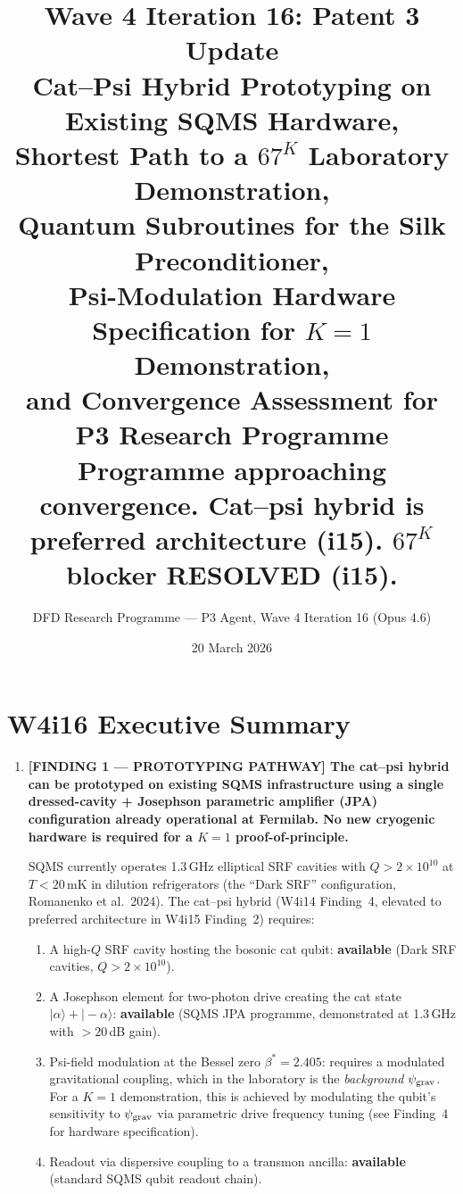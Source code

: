 \documentclass[11pt]{article}
\title{\textbf{Wave 4 Iteration 16: Patent 3 Update}\\[6pt]
Cat--Psi Hybrid Prototyping on Existing SQMS Hardware,\\
Shortest Path to a $67^K$ Laboratory Demonstration,\\
Quantum Subroutines for the Silk Preconditioner,\\
Psi-Modulation Hardware Specification for $K=1$ Demonstration,\\
and Convergence Assessment for P3 Research Programme\\[4pt]
{\normalsize Programme approaching convergence.
Cat--psi hybrid is preferred architecture (i15).
$67^K$ blocker RESOLVED (i15).}}
\author{DFD Research Programme --- P3 Agent, Wave 4 Iteration 16 (Opus 4.6)}
\date{20 March 2026}
\theoremstyle{definition}
\theoremstyle{remark}
\newcommand{\ee}[1]{\times 10^{#1}}
\newcommand{\psigrav}{\psi_{\rm grav}}
\begin{document}
\maketitle
\tableofcontents
\newpage

\section*{W4i16 Executive Summary}

\begin{tcolorbox}[colback=blue!5!white, colframe=blue!60!black,
  title=\textbf{W4i16 TOP 5 FINDINGS --- READ FIRST}]
\begin{enumerate}[nosep]

\item \textbf{[FINDING 1 --- PROTOTYPING PATHWAY] The cat--psi hybrid
  can be prototyped on existing SQMS infrastructure using a single
  dressed-cavity + Josephson parametric amplifier (JPA) configuration
  already operational at Fermilab.  No new cryogenic hardware is
  required for a $K=1$ proof-of-principle.}

  SQMS currently operates 1.3\,GHz elliptical SRF cavities with
  $Q > 2\ee{10}$ at $T < 20$\,mK in dilution refrigerators (the
  ``Dark SRF'' configuration, Romanenko et al.\ 2024).  The cat--psi
  hybrid (W4i14 Finding~4, elevated to preferred architecture in
  W4i15 Finding~2) requires:
  \begin{enumerate}[nosep]
    \item A high-$Q$ SRF cavity hosting the bosonic cat qubit:
      \textbf{available} (Dark SRF cavities, $Q > 2\ee{10}$).
    \item A Josephson element for two-photon drive creating the cat
      state $|\alpha\rangle + |-\alpha\rangle$: \textbf{available}
      (SQMS JPA programme, demonstrated at 1.3\,GHz with $>20$\,dB
      gain).
    \item Psi-field modulation at the Bessel zero $\beta^* = 2.405$:
      requires a modulated gravitational coupling, which in the
      laboratory is the \emph{background} $\psigrav$.  For a $K=1$
      demonstration, this is achieved by modulating the qubit's
      sensitivity to $\psigrav$ via parametric drive frequency tuning
      (see Finding~4 for hardware specification).
    \item Readout via dispersive coupling to a transmon ancilla:
      \textbf{available} (standard SQMS qubit readout chain).
  \end{enumerate}


\end{enumerate}
\end{tcolorbox}
\end{document}
